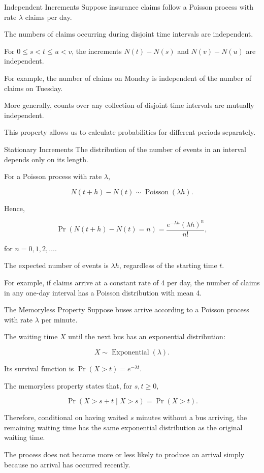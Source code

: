 \documentclass[
  ignorenonframetext,
  aspectratio=169,
]{beamer}
\begin{document}
\begin{frame}{Independent Increments}
\protect{}\label{independent-increments}
Suppose insurance claims follow a Poisson process with rate \(\lambda\)
claims per day.

The numbers of claims occurring during disjoint time intervals are
independent.

For \(0 \leq s < t \leq u < v\), the increments \(N(t)-N(s)\) and
\(N(v)-N(u)\) are independent.

For example, the number of claims on Monday is independent of the number
of claims on Tuesday.

More generally, counts over any collection of disjoint time intervals
are mutually independent.

This property allows us to calculate probabilities for different periods
separately.
\end{frame}

\begin{frame}{Stationary Increments}
\protect{}\label{stationary-increments}
The distribution of the number of events in an interval depends only on
its length.

For a Poisson process with rate \(\lambda\),

\[
N(t+h)-N(t)\sim \operatorname{Poisson}(\lambda h).
\]

Hence,

\[
\Pr(N(t+h)-N(t)=n)
=\frac{e^{-\lambda h}(\lambda h)^n}{n!},
\]

for \(n=0,1,2,\ldots\).

The expected number of events is \(\lambda h\), regardless of the
starting time \(t\).

For example, if claims arrive at a constant rate of 4 per day, the
number of claims in any one-day interval has a Poisson distribution with
mean 4.
\end{frame}

\begin{frame}{The Memoryless Property}
\protect{}\label{the-memoryless-property}
Suppose buses arrive according to a Poisson process with rate
\(\lambda\) per minute.

The waiting time \(X\) until the next bus has an exponential
distribution:

\[
X\sim\operatorname{Exponential}(\lambda).
\]

Its survival function is \(\Pr(X>t)=e^{-\lambda t}\).

The memoryless property states that, for \(s,t\geq 0\),

\[
\Pr(X>s+t\mid X>s)=\Pr(X>t).
\]

Therefore, conditional on having waited \(s\) minutes without a bus
arriving, the remaining waiting time has the same exponential
distribution as the original waiting time.

The process does not become more or less likely to produce an arrival
simply because no arrival has occurred recently.
\end{frame}
\end{document}

